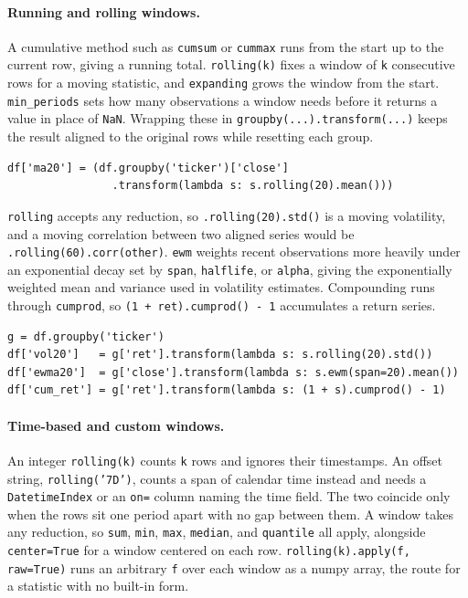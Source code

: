 \paragraph{Running and rolling windows.} A cumulative method such as \texttt{cumsum} or \texttt{cummax} runs from the start up to the current row, giving a running total. \texttt{rolling(k)} fixes a window of \texttt{k} consecutive rows for a moving statistic, and \texttt{expanding} grows the window from the start. \texttt{min\_periods} sets how many observations a window needs before it returns a value in place of \texttt{NaN}. Wrapping these in \texttt{groupby(...).transform(...)} keeps the result aligned to the original rows while resetting each group.

\begin{lstlisting}[style=python, caption={A per-group moving average aligned to the rows}]
df['ma20'] = (df.groupby('ticker')['close']
                .transform(lambda s: s.rolling(20).mean()))
\end{lstlisting}

\vspace{-1ex}

\texttt{rolling} accepts any reduction, so \texttt{.rolling(20).std()} is a moving volatility, and a moving correlation between two aligned series would be \texttt{.rolling(60).corr(other)}. \texttt{ewm} weights recent observations more heavily under an exponential decay set by \texttt{span}, \texttt{halflife}, or \texttt{alpha}, giving the exponentially weighted mean and variance used in volatility estimates. Compounding runs through \texttt{cumprod}, so \texttt{(1 + ret).cumprod() - 1} accumulates a return series.

\begin{lstlisting}[style=python, caption={Moving volatility, exponential mean, and compounded return}]
g = df.groupby('ticker')
df['vol20']   = g['ret'].transform(lambda s: s.rolling(20).std())
df['ewma20']  = g['close'].transform(lambda s: s.ewm(span=20).mean())
df['cum_ret'] = g['ret'].transform(lambda s: (1 + s).cumprod() - 1)
\end{lstlisting}

\vspace{-1ex}

\paragraph{Time-based and custom windows.} An integer \texttt{rolling(k)} counts \texttt{k} rows and ignores their timestamps. An offset string, \texttt{rolling('7D')}, counts a span of calendar time instead and needs a \texttt{DatetimeIndex} or an \texttt{on=} column naming the time field. The two coincide only when the rows sit one period apart with no gap between them. A window takes any reduction, so \texttt{sum}, \texttt{min}, \texttt{max}, \texttt{median}, and \texttt{quantile} all apply, alongside \texttt{center=True} for a window centered on each row. \texttt{rolling(k).apply(f, raw=True)} runs an arbitrary \texttt{f} over each window as a numpy array, the route for a statistic with no built-in form.

